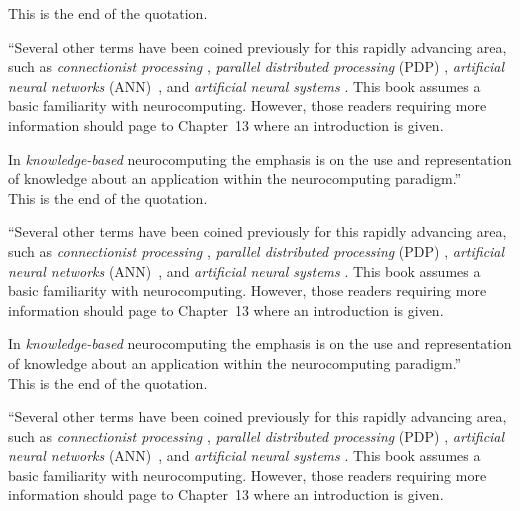 This is the end of the quotation.

``Several other terms have 
been coined previously for this rapidly advancing area, such as 
\emph{connectionist processing} 
\citep{shas95}, 
\emph{parallel distributed processing}
(PDP) \citep{rume86},
\emph{artificial neural networks}
(ANN)~\citep{hass95,roja96},
and 
\emph{artificial neural systems}
\citep{zurada92}.
This book assumes a basic familiarity with neurocomputing. However, 
those readers requiring more information should page to Chapter~13 
where an introduction is given.

In \emph{knowledge-based}  neurocomputing the emphasis is on the use 
and representation of knowledge about an application within the 
neurocomputing paradigm.''\\

This is the end of the quotation.

``Several other terms have 
been coined previously for this rapidly advancing area, such as 
\emph{connectionist processing} 
\citep{shas95}, 
\emph{parallel distributed processing}
(PDP) \citep{rume86},
\emph{artificial neural networks}
(ANN)~\citep{hass95,roja96},
and 
\emph{artificial neural systems}
\citep{zurada92}.
This book assumes a basic familiarity with neurocomputing. However, 
those readers requiring more information should page to Chapter~13 
where an introduction is given.

In \emph{knowledge-based}  neurocomputing the emphasis is on the use 
and representation of knowledge about an application within the 
neurocomputing paradigm.''\\

This is the end of the quotation.

``Several other terms have 
been coined previously for this rapidly advancing area, such as 
\emph{connectionist processing} 
\citep{shas95}, 
\emph{parallel distributed processing}
(PDP) \citep{rume86},
\emph{artificial neural networks}
(ANN)~\citep{hass95,roja96},
and 
\emph{artificial neural systems}
\citep{zurada92}.
This book assumes a basic familiarity with neurocomputing. However, 
those readers requiring more information should page to Chapter~13 
where an introduction is given.

